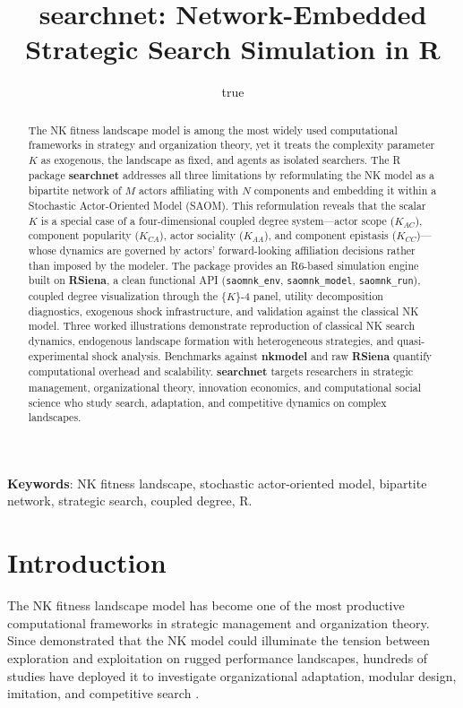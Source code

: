 \documentclass[
]{article}
\title{\textbf{searchnet}: Network-Embedded Strategic Search Simulation
in \textsf{R}}
\author{true}
\date{}
\newcommand{\pkg}[1]{\textbf{#1}}
\newcommand{\proglang}[1]{\textsf{#1}}
\newcommand{\code}[1]{\texttt{#1}}
\begin{document}
\maketitle
\begin{abstract}
The NK fitness landscape model is among the most widely used
computational frameworks in strategy and organization theory, yet it
treats the complexity parameter \(K\) as exogenous, the landscape as
fixed, and agents as isolated searchers. The \proglang{R} package
\pkg{searchnet} addresses all three limitations by reformulating the NK
model as a bipartite network of \(M\) actors affiliating with \(N\)
components and embedding it within a Stochastic Actor-Oriented Model
(SAOM). This reformulation reveals that the scalar \(K\) is a special
case of a four-dimensional coupled degree system---actor scope
(\(K_{AC}\)), component popularity (\(K_{CA}\)), actor sociality
(\(K_{AA}\)), and component epistasis (\(K_{CC}\))---whose dynamics are
governed by actors' forward-looking affiliation decisions rather than
imposed by the modeler. The package provides an \proglang{R6}-based
simulation engine built on \pkg{RSiena}, a clean functional API
(\code{saomnk\_env}, \code{saomnk\_model}, \code{saomnk\_run}), coupled
degree visualization through the \(\{K\}\)-4 panel, utility
decomposition diagnostics, exogenous shock infrastructure, and
validation against the classical NK model. Three worked illustrations
demonstrate reproduction of classical NK search dynamics, endogenous
landscape formation with heterogeneous strategies, and
quasi-experimental shock analysis. Benchmarks against \pkg{nkmodel} and
raw \pkg{RSiena} quantify computational overhead and scalability.
\pkg{searchnet} targets researchers in strategic management,
organizational theory, innovation economics, and computational social
science who study search, adaptation, and competitive dynamics on
complex landscapes.
\end{abstract}

\textbf{Keywords}: NK fitness landscape, stochastic actor-oriented
model, bipartite network, strategic search, coupled degree, R.

\section{Introduction}\label{introduction}

The NK fitness landscape model
\citep{Kauffman1987, KauffmanWeinberger1989} has become one of the most
productive computational frameworks in strategic management and
organization theory. Since \citet{Levinthal1997} demonstrated that the
NK model could illuminate the tension between exploration and
exploitation on rugged performance landscapes, hundreds of studies have
deployed it to investigate organizational adaptation, modular design,
imitation, and competitive search
\citep{Baumann2019, Rivkin2000, SiggelkowRivkin2005}.
\end{document}
